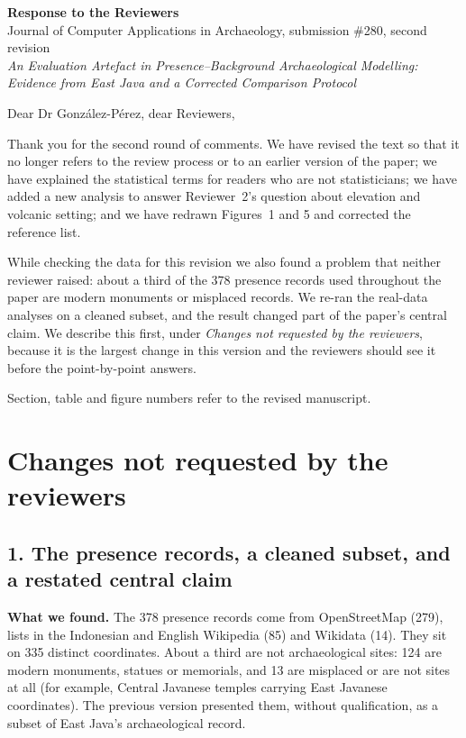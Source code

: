 \documentclass[11pt,a4paper]{article}
\begin{document}
\begin{center}
{\large\bfseries Response to the Reviewers}\\[4pt]
Journal of Computer Applications in Archaeology, submission \#280, second revision\\
\textit{An Evaluation Artefact in Presence--Background Archaeological Modelling: Evidence from East Java and a Corrected Comparison Protocol}
\end{center}

Dear Dr González-Pérez, dear Reviewers,

Thank you for the second round of comments. We have revised the text so that it no longer refers to the review
process or to an earlier version of the paper; we have explained the statistical terms for readers who are not
statisticians; we have added a new analysis to answer Reviewer~2's question about elevation and volcanic setting; and we
have redrawn Figures~1 and 5 and corrected the reference list.

While checking the data for this revision we also found a problem that neither reviewer raised: about a third of the
378 presence records used throughout the paper are modern monuments or misplaced records. We re-ran the real-data
analyses on a cleaned subset, and the result changed part of the paper's central claim. We describe this first, under
\emph{Changes not requested by the reviewers}, because it is the largest change in this version and the reviewers should
see it before the point-by-point answers.

Section, table and figure numbers refer to the revised manuscript.

\section*{Changes not requested by the reviewers}

\subsection*{1. The presence records, a cleaned subset, and a restated central claim}

\textbf{What we found.} The 378 presence records come from OpenStreetMap (279), lists in the Indonesian and English
Wikipedia (85) and Wikidata (14). They sit on 335 distinct coordinates. About a third are not archaeological sites:
124 are modern monuments, statues or memorials, and 13 are misplaced or are not sites at all (for example, Central
Javanese temples carrying East Javanese coordinates). The previous version presented them, without qualification, as a
subset of East Java's archaeological record.
\end{document}
